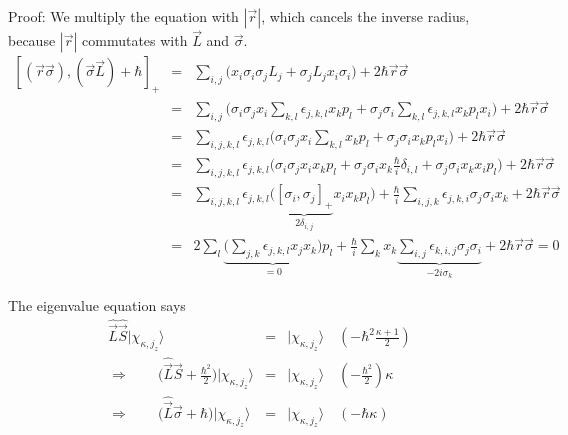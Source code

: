 \documentclass[11pt,a4paper]{report}
\begin{document}
\begin{itemize}
  Proof: We multiply the equation with $|\vec{r}|$, which cancels the
  inverse radius, because $|\vec{r}|$ commutates with $\vec{L}$ and
  $\vec{\sigma}$.
\begin{eqnarray*}
\left[(\vec{r}\vec{\sigma}),(\vec{\sigma}\vec{L})+\hbar\right]_+
&=&\sum_{i,j}\biggl(x_i\sigma_i\sigma_jL_j+\sigma_jL_jx_i\sigma_i\biggr)
+2\hbar\vec{r}\vec{\sigma}
\\
&=&\sum_{i,j}\biggl(\sigma_i\sigma_jx_i\sum_{k,l}\epsilon_{j,k,l}x_kp_l
+\sigma_j\sigma_i\sum_{k,l}\epsilon_{j,k,l}x_kp_lx_i\biggr)
+2\hbar\vec{r}\vec{\sigma}
\\
&=&\sum_{i,j,k,l}\epsilon_{j,k,l}
\biggl(\sigma_i\sigma_jx_i\sum_{k,l}x_kp_l
+\sigma_j\sigma_i x_kp_lx_i\biggr)
+2\hbar\vec{r}\vec{\sigma}
\\
&=&\sum_{i,j,k,l}\epsilon_{j,k,l}
\biggl(\sigma_i\sigma_jx_ix_kp_l
+\sigma_j\sigma_i x_k\frac{\hbar}{i}\delta_{i,l}
+\sigma_j\sigma_i x_kx_ip_l
\biggr)
+2\hbar\vec{r}\vec{\sigma}
\\
&=&\sum_{i,j,k,l}\epsilon_{j,k,l}
\biggl(\underbrace{\left[\sigma_i,\sigma_j\right]_+}_{2\delta_{i,j}}x_ix_kp_l
\biggr)
+\frac{\hbar}{i}\sum_{i,j,k}\epsilon_{j,k,i}\sigma_j \sigma_i x_k
+2\hbar\vec{r}\vec{\sigma}
\\
&=&2\sum_l\underbrace{\biggl(\sum_{j,k}\epsilon_{j,k,l}x_jx_k\biggr)}_{=0}p_l
+\frac{\hbar}{i}\sum_k x_k
\underbrace{\sum_{i,j}\epsilon_{k,i,j}\sigma_j \sigma_i}_{-2i\sigma_k}
+2\hbar\vec{r}\vec{\sigma}=0
\end{eqnarray*}

The eigenvalue equation  says
\begin{eqnarray*}
\hat{\vec{L}}\hat{\vec{S}}|\chi_{\kappa,j_z}\rangle
&=&|\chi_{\kappa,j_z}\rangle\quad\left(-\hbar^2\frac{\kappa+1}{2}\right)
\\
\Rightarrow\qquad
\biggl(\hat{\vec{L}}\hat{\vec{S}}+\frac{\hbar^2}{2}\biggr)
|\chi_{\kappa,j_z}\rangle
&=&|\chi_{\kappa,j_z}\rangle\quad\left(-\frac{\hbar^2}{2}\right)\kappa
\\
\Rightarrow\qquad
\biggl(\hat{\vec{L}}\hat{\vec{\sigma}}+\hbar\biggr)
|\chi_{\kappa,j_z}\rangle
&=&|\chi_{\kappa,j_z}\rangle\quad\left(-\hbar\kappa\right)
\end{eqnarray*}


\end{itemize}
\end{document}
